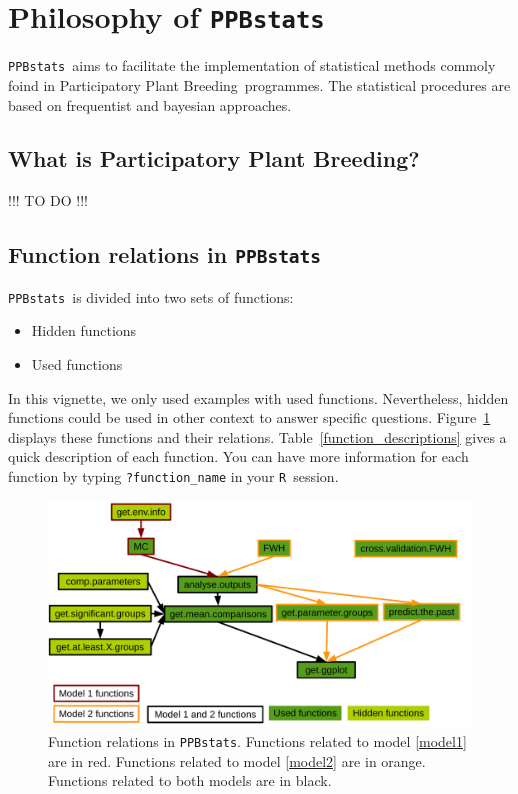 \documentclass{article}\usepackage[]{graphicx}\usepackage[]{color}
\newcommand{\pack}{\texttt{PPBstats}}
\newcommand{\R}{\texttt{R}}
\newcommand{\PPB}{Participatory Plant Breeding}
\begin{document}



\section{Philosophy of \pack}
\label{philo}

\pack~aims to facilitate the implementation of statistical methods commoly foind in \PPB~programmes.
The statistical procedures are based on frequentist and bayesian approaches.

\subsection{What is \PPB ?}

!!! TO DO !!!

\subsection{Function relations in \pack}

\pack~is divided into two sets of functions:

\begin{itemize}
\item Hidden functions
\item Used functions
\end{itemize}

In this vignette, we only used examples with used functions.
Nevertheless, hidden functions could be used in other context to answer specific questions.
Figure~\ref{function_relations} displays these functions and their relations.
Table~\ref{function_descriptions} gives a quick description of each function.
You can have more information for each function by typing \texttt{?function\_name} in your \R~session.


\begin{figure}[H]
\begin{center}
\includegraphics[width=\textwidth]{PBBstats_function_relations}
\end{center}
\caption{Function relations in \pack.
Functions related to model \ref{model1} are in red.
Functions related to model \ref{model2} are in orange.
Functions related to both models are in black.
}
\label{function_relations}
\end{figure}
\end{document}
